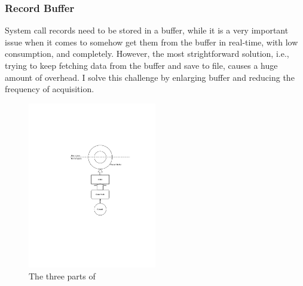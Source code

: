 

\subsubsection{Record Buffer}

System call records need to be stored in a buffer, while it is a very important issue when it comes to somehow get them from the buffer in real-time, with low consumption, and completely. However, the most strightforward solution, i.e., trying to keep fetching data from the buffer and save to file, causes a huge amount of overhead. I solve this challenge by enlarging buffer and reducing the frequency of acquisition.





\begin{figure}
    \centering
    \includegraphics[width=0.5\textwidth]{figures/arch.pdf}
    \caption{The three parts of \TheName}
    \label{fig:arch}
\end{figure}



